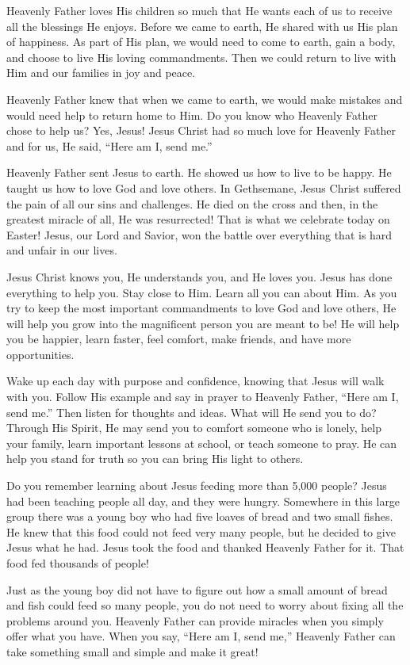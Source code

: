 \documentclass[letterpaper, 11pt]{report}
\begin{document}
Heavenly Father loves His children so much that He wants each of us to receive all the blessings He enjoys. Before we came to earth, He shared with us His plan of happiness. As part of His plan, we would need to come to earth, gain a body, and choose to live His loving commandments. Then we could return to live with Him and our families in joy and peace.

Heavenly Father knew that when we came to earth, we would make mistakes and would need help to return home to Him. Do you know who Heavenly Father chose to help us? Yes, Jesus! Jesus Christ had so much love for Heavenly Father and for us, He said, “Here am I, send me.”

Heavenly Father sent Jesus to earth. He showed us how to live to be happy. He taught us how to love God and love others. In Gethsemane, Jesus Christ suffered the pain of all our sins and challenges. He died on the cross and then, in the greatest miracle of all, He was resurrected! That is what we celebrate today on Easter! Jesus, our Lord and Savior, won the battle over everything that is hard and unfair in our lives.

Jesus Christ knows you, He understands you, and He loves you. Jesus has done everything to help you. Stay close to Him. Learn all you can about Him. As you try to keep the most important commandments to love God and love others, He will help you grow into the magnificent person you are meant to be! He will help you be happier, learn faster, feel comfort, make friends, and have more opportunities.

Wake up each day with purpose and confidence, knowing that Jesus will walk with you. Follow His example and say in prayer to Heavenly Father, “Here am I, send me.” Then listen for thoughts and ideas. What will He send you to do? Through His Spirit, He may send you to comfort someone who is lonely, help your family, learn important lessons at school, or teach someone to pray. He can help you stand for truth so you can bring His light to others.

Do you remember learning about Jesus feeding more than 5,000 people? Jesus had been teaching people all day, and they were hungry. Somewhere in this large group there was a young boy who had five loaves of bread and two small fishes. He knew that this food could not feed very many people, but he decided to give Jesus what he had. Jesus took the food and thanked Heavenly Father for it. That food fed thousands of people!

Just as the young boy did not have to figure out how a small amount of bread and fish could feed so many people, you do not need to worry about fixing all the problems around you. Heavenly Father can provide miracles when you simply offer what you have. When you say, “Here am I, send me,” Heavenly Father can take something small and simple and make it great!
\end{document}
